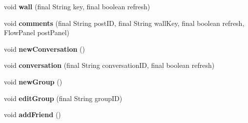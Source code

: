 \begin{DoxyCompactItemize}
\item 
\hypertarget{classballmerpeak_1_1turtlenet_1_1client_1_1frontend_a8911e15af92aa31b90cdc2ec0cd78a3a}{void {\bfseries wall} (final String key, final boolean refresh)}\label{classballmerpeak_1_1turtlenet_1_1client_1_1frontend_a8911e15af92aa31b90cdc2ec0cd78a3a}

\item 
\hypertarget{classballmerpeak_1_1turtlenet_1_1client_1_1frontend_a936e2b44e7f19a58586752ae5317bdfd}{void {\bfseries comments} (final String post\-I\-D, final String wall\-Key, final boolean refresh, Flow\-Panel post\-Panel)}\label{classballmerpeak_1_1turtlenet_1_1client_1_1frontend_a936e2b44e7f19a58586752ae5317bdfd}

\item 
\hypertarget{classballmerpeak_1_1turtlenet_1_1client_1_1frontend_aa36f8f33cf634edf044aa9d31790ac67}{void {\bfseries new\-Conversation} ()}\label{classballmerpeak_1_1turtlenet_1_1client_1_1frontend_aa36f8f33cf634edf044aa9d31790ac67}

\item 
\hypertarget{classballmerpeak_1_1turtlenet_1_1client_1_1frontend_a27cabae704f2e4164bfcb5b18184144d}{void {\bfseries conversation} (final String conversation\-I\-D, final boolean refresh)}\label{classballmerpeak_1_1turtlenet_1_1client_1_1frontend_a27cabae704f2e4164bfcb5b18184144d}

\item 
\hypertarget{classballmerpeak_1_1turtlenet_1_1client_1_1frontend_a931cf38d0a5bb38b3d15b7c04eaaa6b7}{void {\bfseries new\-Group} ()}\label{classballmerpeak_1_1turtlenet_1_1client_1_1frontend_a931cf38d0a5bb38b3d15b7c04eaaa6b7}

\item 
\hypertarget{classballmerpeak_1_1turtlenet_1_1client_1_1frontend_a8017892ef2b857bdac093a24ddb5dfa3}{void {\bfseries edit\-Group} (final String group\-I\-D)}\label{classballmerpeak_1_1turtlenet_1_1client_1_1frontend_a8017892ef2b857bdac093a24ddb5dfa3}

\item 
\hypertarget{classballmerpeak_1_1turtlenet_1_1client_1_1frontend_a0862ca49f2b011650c302787602c1395}{void {\bfseries add\-Friend} ()}\label{classballmerpeak_1_1turtlenet_1_1client_1_1frontend_a0862ca49f2b011650c302787602c1395}

\end{DoxyCompactItemize}
